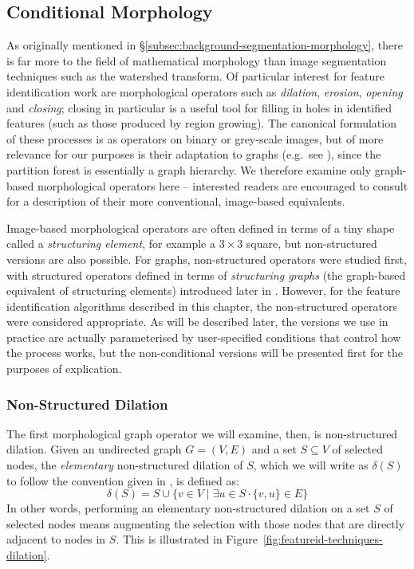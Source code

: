 \subsection{Conditional Morphology}

As originally mentioned in \S\ref{subsec:background-segmentation-morphology}, there is far more to the field of mathematical morphology than image segmentation techniques such as the watershed transform. Of particular interest for feature identification work are morphological operators such as \emph{dilation}, \emph{erosion}, \emph{opening} and \emph{closing}; closing in particular is a useful tool for filling in holes in identified features (such as those produced by region growing). The canonical formulation of these processes is as operators on binary or grey-scale images, but of more relevance for our purposes is their adaptation to graphs (e.g.~see \cite{heijmans92a}), since the partition forest is essentially a graph hierarchy. We therefore examine only graph-based morphological operators here -- interested readers are encouraged to consult \cite{gonzalez02} for a description of their more conventional, image-based equivalents.

Image-based morphological operators are often defined in terms of a tiny shape called a \emph{structuring element}, for example a $3 \times 3$ square, but non-structured versions are also possible. For graphs, non-structured operators were studied first, with structured operators defined in terms of \emph{structuring graphs} (the graph-based equivalent of structuring elements) introduced later in \cite{heijmans92a}. However, for the feature identification algorithms described in this chapter, the non-structured operators were considered appropriate. As will be described later, the versions we use in practice are actually parameterised by user-specified conditions that control how the process works, but the non-conditional versions will be presented first for the purposes of explication.

\subsubsection{Non-Structured Dilation}

The first morphological graph operator we will examine, then, is non-structured dilation. Given an undirected graph $G = (V,E)$ and a set $S \subseteq V$ of selected nodes, the \emph{elementary} non-structured dilation of $S$, which we will write as $\delta(S)$ to follow the convention given in \cite{heijmans92a}, is defined as:
%
\[
\delta(S) = S \cup \{v \in V \; | \; \exists u \in S \cdot \{v,u\} \in E\}
\]
%
In other words, performing an elementary non-structured dilation on a set $S$ of selected nodes means augmenting the selection with those nodes that are directly adjacent to nodes in $S$. This is illustrated in Figure~\ref{fig:featureid-techniques-dilation}.

